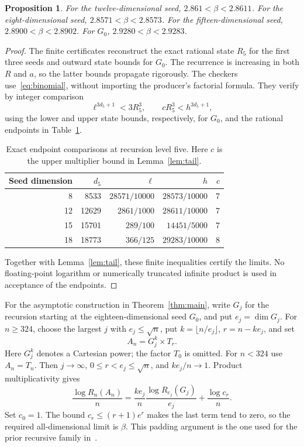 \documentclass[11pt]{article}
\newtheorem{proposition}[theorem]{Proposition}
\begin{document}
\begin{proposition}\label{prop:endpoints}
For the twelve-dimensional seed, $2.861<\beta<2.8611$.
For the eight-dimensional seed, $2.8571<\beta<2.8573$.
For the fifteen-dimensional seed, $2.8900<\beta<2.8902$.
For $G_0$, $2.9280<\beta<2.9283$.
\end{proposition}
\begin{proof}
The finite certificates reconstruct the exact rational state $R_5$ for
the first three seeds and outward state bounds for $G_0$.
The recurrence is increasing in both $R$ and $a$, so the latter bounds
propagate rigorously. The checkers use~\eqref{eq:binomial}, without
importing the producer's factorial formula. They verify by integer
comparison
\[
 \ell^{3d_5+1}<3R_5^3,\qquad cR_5^3<h^{3d_5+1},
\]
using the lower and upper state bounds, respectively, for $G_0$, and
the rational endpoints in Table~\ref{tab:endpoints}.

\begin{table}[htbp]
\centering
\caption{Exact endpoint comparisons at recursion level five. Here $c$
is the upper multiplier bound in Lemma~\ref{lem:tail}.}
\label{tab:endpoints}
\begin{tabular}{rrrrr}
\toprule
Seed dimension & $d_5$ & $\ell$ & $h$ & $c$\\
\midrule
8  & 8533  & $28571/10000$ & $28573/10000$ & 7\\
12 & 12629 & $2861/1000$   & $28611/10000$ & 7\\
15 & 15701 & $289/100$     & $14451/5000$ & 7\\
18 & 18773 & $366/125$     & $29283/10000$ & 8\\
\bottomrule
\end{tabular}
\end{table}

Together with Lemma~\ref{lem:tail}, these finite inequalities certify
the limits. No floating-point logarithm or numerically truncated infinite
product is used in acceptance of the endpoints.
\end{proof}

For the asymptotic construction in Theorem~\ref{thm:main}, write $G_j$
for the recursion starting at the eighteen-dimensional seed $G_0$, and
put $e_j=\dim G_j$. For $n\ge324$, choose the largest $j$ with
$e_j\le\sqrt n$, put $k=\lfloor n/e_j\rfloor$, $r=n-ke_j$, and set
\[
 A_n=G_j^k\times T_r.
\]
Here $G_j^k$ denotes a Cartesian power; the factor $T_0$ is omitted.
For $n<324$ use $A_n=T_n$. Then $j\to\infty$,
$0\le r<e_j\le\sqrt n$, and $ke_j/n\to1$. Product multiplicativity gives
\[
 \frac{\log R_n(A_n)}n
 =\frac{ke_j}{n}\frac{\log R_{e_j}(G_j)}{e_j}+\frac{\log c_r}{n}.
\]
Set $c_0=1$. The bound $c_r\le(r+1)e^r$ makes the last term tend to zero,
so the required all-dimensional limit is $\beta$. This padding argument
is the one used for the prior recursive family in~\cite[Corollary 9.3]{mxym-calculus}.
\end{document}
